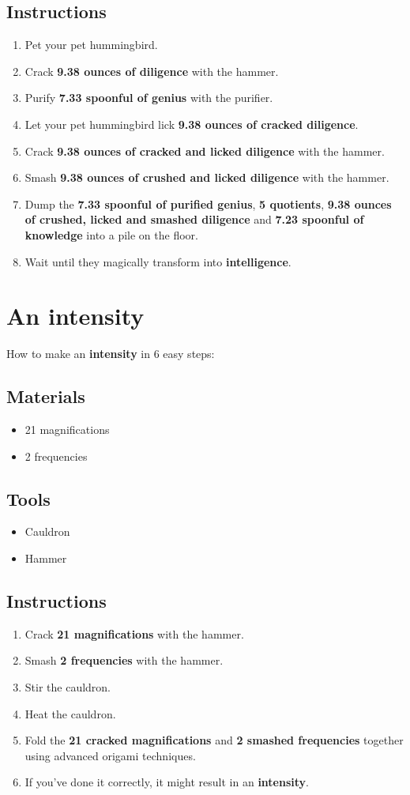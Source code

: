 \documentclass{article}
\begin{document}
\subsection{Instructions}\begin{enumerate}
\item 
Pet your pet hummingbird.
\item 
Crack \textbf{9.38 ounces of diligence} with the hammer.
\item 
Purify \textbf{7.33 spoonful of genius} with the purifier.
\item 
Let your pet hummingbird lick \textbf{9.38 ounces of cracked diligence}.
\item 
Crack \textbf{9.38 ounces of cracked and licked diligence} with the hammer.
\item 
Smash \textbf{9.38 ounces of crushed and licked diligence} with the hammer.
\item 
Dump the \textbf{7.33 spoonful of purified genius}, \textbf{5 quotients}, \textbf{9.38 ounces of crushed, licked and smashed diligence} and \textbf{7.23 spoonful of knowledge} into a pile on the floor.
\item 
Wait until they magically transform into \textbf{intelligence}.
\end{enumerate}
\newpage
\section{An intensity}How to make an \textbf{intensity} in 6 easy steps:

\subsection{Materials}\begin{itemize}
\item 
21 magnifications
\item 
2 frequencies
\end{itemize}
\subsection{Tools}\begin{itemize}
\item 
Cauldron
\item 
Hammer
\end{itemize}
\subsection{Instructions}\begin{enumerate}
\item 
Crack \textbf{21 magnifications} with the hammer.
\item 
Smash \textbf{2 frequencies} with the hammer.
\item 
Stir the cauldron.
\item 
Heat the cauldron.
\item 
Fold the \textbf{21 cracked magnifications} and \textbf{2 smashed frequencies} together using advanced origami techniques.
\item 
If you've done it correctly, it might result in an \textbf{intensity}.
\end{enumerate}
\newpage
\end{document}

